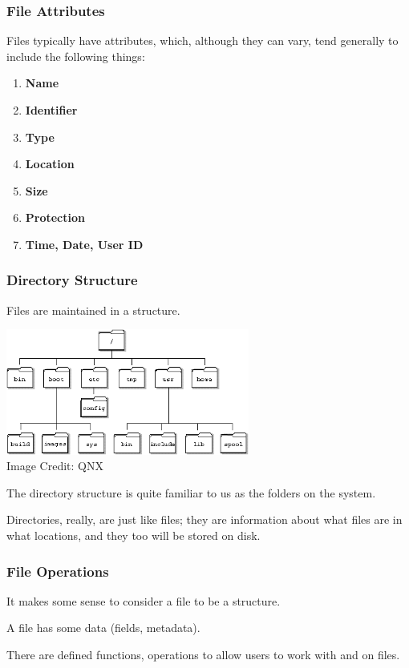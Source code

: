 \begin{frame}
	\frametitle{File Attributes}

	Files typically have attributes, which, although they can vary, tend generally to include the following things:

	\begin{enumerate}
		\item \textbf{Name}
		\item \textbf{Identifier}
		\item \textbf{Type}
		\item \textbf{Location}
		\item \textbf{Size}
		\item \textbf{Protection}
		\item \textbf{Time, Date, User ID}
	\end{enumerate}


\end{frame}

\begin{frame}
	\frametitle{Directory Structure}

	Files are maintained in a structure.

	\begin{center}
		\includegraphics[width=0.6\textwidth]{images/qnx-directory.png}\\
		Image Credit: QNX
	\end{center}



	The directory structure is quite familiar to us as the folders on the system.

	Directories, really, are just like files; they are information about what files are in what locations, and they too will be stored on disk.


\end{frame}

\begin{frame}
	\frametitle{File Operations}

	It makes some sense to consider a file to be a structure.

	A file has some data (fields, metadata).

	There are defined functions, operations to allow users to work with and on files.

\end{frame}

